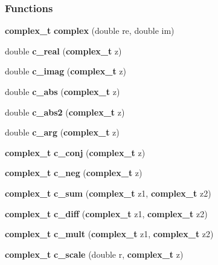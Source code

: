 \subsubsection*{Functions}
\begin{CompactItemize}
\item 
{\bf complex\_\-t} \textbf{complex} (double re, double im)\label{group__nr_g203888bac468229094352b2bb9456417}

\item 
double \textbf{c\_\-real} ({\bf complex\_\-t} z)\label{group__nr_gbd9dcd9992cad1f6af326811da66fc9a}

\item 
double \textbf{c\_\-imag} ({\bf complex\_\-t} z)\label{group__nr_g6adc8ee3a56fe88de97c3f40c484f824}

\item 
double \textbf{c\_\-abs} ({\bf complex\_\-t} z)\label{group__nr_gdd54790aa13824ee1db3d0558a465071}

\item 
double \textbf{c\_\-abs2} ({\bf complex\_\-t} z)\label{group__nr_g5a31b290dd721358e4270d9686347dde}

\item 
double \textbf{c\_\-arg} ({\bf complex\_\-t} z)\label{group__nr_g5a8776cef7d6ef88a11015d6ec2665ba}

\item 
{\bf complex\_\-t} \textbf{c\_\-conj} ({\bf complex\_\-t} z)\label{group__nr_g26f4378875ac801b1b5bb7a13f180f0a}

\item 
{\bf complex\_\-t} \textbf{c\_\-neg} ({\bf complex\_\-t} z)\label{group__nr_g33f198bcc4dd193c4f8c8db9049311d2}

\item 
{\bf complex\_\-t} \textbf{c\_\-sum} ({\bf complex\_\-t} z1, {\bf complex\_\-t} z2)\label{group__nr_g176d351f4b035de54e1fb9974c296bed}

\item 
{\bf complex\_\-t} \textbf{c\_\-diff} ({\bf complex\_\-t} z1, {\bf complex\_\-t} z2)\label{group__nr_g5b48402b525952efb744f5b2804d1957}

\item 
{\bf complex\_\-t} \textbf{c\_\-mult} ({\bf complex\_\-t} z1, {\bf complex\_\-t} z2)\label{group__nr_gbac492f503bff737e6a11c03e44e7ada}

\item 
{\bf complex\_\-t} \textbf{c\_\-scale} (double r, {\bf complex\_\-t} z)\label{group__nr_g4a8c814a8cb7b92c919b23e1ea64d615}


\end{CompactItemize}
